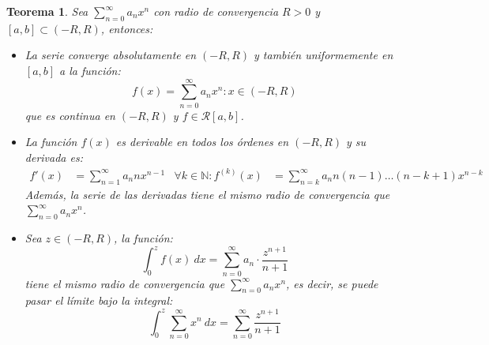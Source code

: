 \documentclass[10pt,a4paper,openright]{book}
\theoremstyle{break}
\newtheorem{theo}{Teorema}[chapter]
\newcommand{\dif}[1]{\ d#1}
\begin{document}
\begin{theo}
Sea $\sum_{n=0}^{\infty} a_n x^n$ con radio de convergencia $R>0$ y $[a,b] \subset (-R, R)$, entonces:
\begin{itemize}
\item La serie converge absolutamente en $(-R, R)$ y también uniformemente en $[a,b]$ a la función:
$$f(x) = \sum_{n=0}^{\infty} a_n x^n : x \in (-R, R) $$
que es continua en $(-R, R)$ y $f \in \mathcal{R}[a,b]$.

\item La función $f(x)$ es derivable en todos los órdenes en $(-R, R)$ y su derivada es:
\begin{align*}
f'(x) & = \sum_{n=1}^{\infty} a_n n x^{n-1} & \forall k \in \mathbb{N}: f^{(k)}(x) & = \sum_{n = k}^{\infty} a_n n (n-1) \ldots (n- k + 1) x^{n-k}
\end{align*}
Además, la serie de las derivadas tiene el mismo radio de convergencia que $\sum_{n=0}^{\infty} a_n x^n$.

\item Sea $z \in (-R,R)$, la función:
$$\int_{0}^{z} f(x) \dif{x} = \sum_{n=0}^{\infty} a_n \cdot \frac{z^{n+1}}{n+1}$$
tiene el mismo radio de convergencia que $\sum_{n=0}^{\infty} a_n x^n$, es decir, se puede pasar el límite bajo la integral:
$$\int_{0}^{z} \sum_{n= 0}^{\infty} x^n \dif{x} = \sum_{n=0}^{\infty} \frac{z^{n+1}}{n+1}$$
\end{itemize}
\end{theo}
\end{document}

